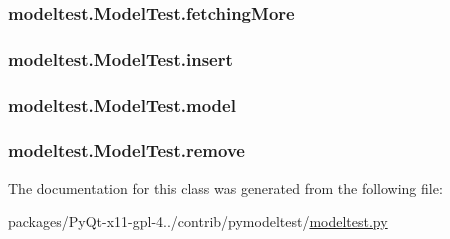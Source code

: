 \subsubsection[{fetching\+More}]{\setlength{\rightskip}{0pt plus 5cm}modeltest.\+Model\+Test.\+fetching\+More}\label{classmodeltest_1_1ModelTest_a0e01a2ecf68b872fb8a21e0de3750871}
\hypertarget{classmodeltest_1_1ModelTest_a842c94a07a108f01a8e9db071807b744}{}
\subsubsection[{insert}]{\setlength{\rightskip}{0pt plus 5cm}modeltest.\+Model\+Test.\+insert}\label{classmodeltest_1_1ModelTest_a842c94a07a108f01a8e9db071807b744}
\hypertarget{classmodeltest_1_1ModelTest_a0454d5da4f5cbdd047af85e449068996}{}
\subsubsection[{model}]{\setlength{\rightskip}{0pt plus 5cm}modeltest.\+Model\+Test.\+model}\label{classmodeltest_1_1ModelTest_a0454d5da4f5cbdd047af85e449068996}
\hypertarget{classmodeltest_1_1ModelTest_ab8c98e7f735fc79fe78ab41e4354ba03}{}
\subsubsection[{remove}]{\setlength{\rightskip}{0pt plus 5cm}modeltest.\+Model\+Test.\+remove}\label{classmodeltest_1_1ModelTest_ab8c98e7f735fc79fe78ab41e4354ba03}


The documentation for this class was generated from the following file\+:\begin{DoxyCompactItemize}
\item 
packages/\+Py\+Qt-\/x11-\/gpl-\/4../contrib/pymodeltest/\hyperlink{modeltest_8py}{modeltest.\+py}\end{DoxyCompactItemize}
